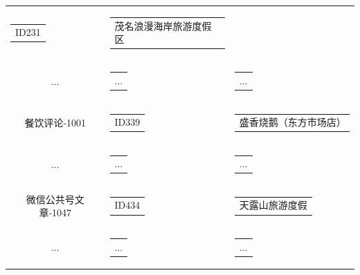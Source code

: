 \documentclass[bwprint]{gmcmthesis}
\begin{document}
\begin{center}
\begin{longtable}{c|c|c}
\begin{tabular}[c]{@{}c@{}}
            ID231
            \end{tabular} 
            & \begin{tabular}[c]{@{}l@{}}
              茂名浪漫海岸旅游度假区
            \end{tabular} \\
            ... & \begin{tabular}[c]{@{}c@{}}
              ...
            \end{tabular} 
            & \begin{tabular}[c]{@{}l@{}}
              ...
            \end{tabular} \\
            餐饮评论-1001 & \begin{tabular}[c]{@{}c@{}}
              ID339
              \end{tabular} 
              & \begin{tabular}[c]{@{}l@{}}
                盛香烧鹅（东方市场店）
              \end{tabular} \\
              ... & \begin{tabular}[c]{@{}c@{}}
                ...
              \end{tabular} 
              & \begin{tabular}[c]{@{}l@{}}
                ...
              \end{tabular} \\
              微信公共号文章-1047 & \begin{tabular}[c]{@{}c@{}}
                ID434
                \end{tabular} 
                & \begin{tabular}[c]{@{}l@{}}
                  天露山旅游度假
                \end{tabular} \\
                ... & \begin{tabular}[c]{@{}c@{}}
                  ...
                \end{tabular} 
                & \begin{tabular}[c]{@{}l@{}}
                  ...
                \end{tabular} \\
      \hline
  \end{longtable}
  \end{center}
\end{document}
